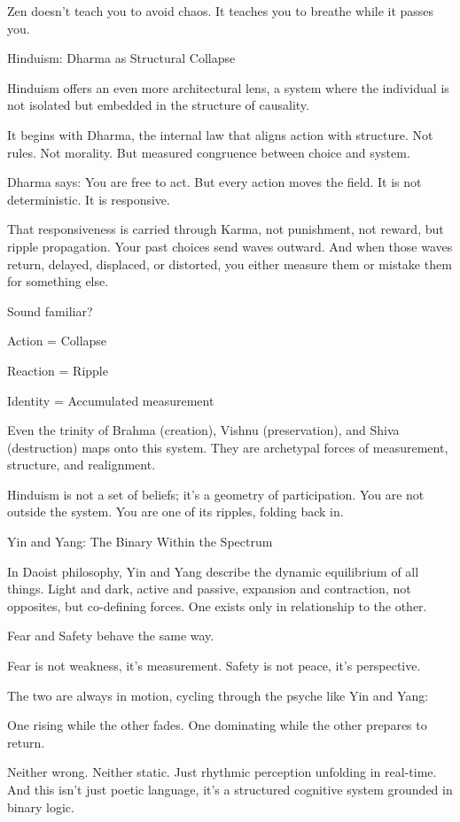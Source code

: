 \documentclass[11pt]{article}
\begin{document}
Zen doesn’t teach you to avoid chaos.
It teaches you to breathe while it passes you.

Hinduism: Dharma as Structural Collapse

Hinduism offers an even more architectural lens, a system where the individual is not isolated but embedded in the structure of causality.

It begins with Dharma, the internal law that aligns action with structure.
Not rules. Not morality. But measured congruence between choice and system.

Dharma says: You are free to act. But every action moves the field.
It is not deterministic. It is responsive.

That responsiveness is carried through Karma, not punishment, not reward, but ripple propagation. Your past choices send waves outward. And when those waves return, delayed, displaced, or distorted, you either measure them or mistake them for something else.

Sound familiar?

Action = Collapse

Reaction = Ripple

Identity = Accumulated measurement

Even the trinity of Brahma (creation), Vishnu (preservation), and Shiva (destruction) maps onto this system. They are archetypal forces of measurement, structure, and realignment.

Hinduism is not a set of beliefs; it’s a geometry of participation.
You are not outside the system. You are one of its ripples, folding back in.

Yin and Yang: The Binary Within the Spectrum

In Daoist philosophy, Yin and Yang describe the dynamic equilibrium of all things. Light and dark, active and passive, expansion and contraction, not opposites, but co-defining forces. One exists only in relationship to the other.

Fear and Safety behave the same way.

Fear is not weakness, it’s measurement.
Safety is not peace, it’s perspective.

The two are always in motion, cycling through the psyche like Yin and Yang:

One rising while the other fades.
One dominating while the other prepares to return.

Neither wrong. Neither static. Just rhythmic perception unfolding in real-time.
And this isn’t just poetic language, it’s a structured cognitive system grounded in binary logic.
\end{document}
